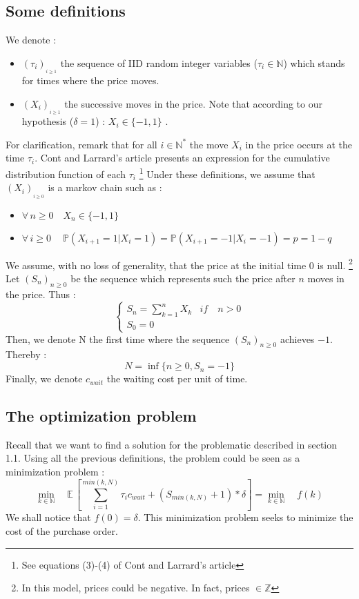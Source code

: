 \documentclass{article}
\begin{document}
\subsection{Some definitions}
We denote :
\begin{itemize}
\item $(\tau_i)_{_{i \geq 1}}$ the sequence of IID random integer variables  ($\tau_i \in \mathbb{N}$) which stands for times where the price moves.
\item $(X_i)_{_{i \geq 1}}$ the successive moves in the price. Note that according to our hypothesis ($\delta = 1$) : $X_i \in \{-1,1\}$ .
\end{itemize}
For clarification, remark that for all $ i \in \mathbb{N^{*}} $ the move $X_i$ in the price occurs at the time $\tau_i$.\newline
Cont and Larrard's article presents an expression for the cumulative distribution function of each $\tau_i$ \footnote{See equations (3)-(4) of Cont and Larrard's article}
\newline
Under these definitions, we assume that $(X_i)_{_{i \geq 0}}$ is a markov chain such as :
\begin{itemize}
\item $\forall \, n\geq0 \quad X_{n} \in \{-1,1\} $ 
\item $\forall \, i\geq0 \quad\ \mathbb{P}( X_{i+1}=1 | X_i=1 ) = \mathbb{P}( X_{i+1}=-1 | X_i=-1 ) = p = 1-q$
\end{itemize}
We assume, with no loss of generality, that the price at the initial time 0 is null. \footnote{In this model, prices could be negative. In fact, prices $\in \mathbb{Z}$}
Let $(S_{n})_{n\geq0}$ be the sequence which represents such the price after $n$ moves in the price. Thus :
\begin{equation*}
     \begin{cases}
        S_{n} = \sum_{k=1}^{n}X_k & if \quad n > 0 \\
        S_0 = 0
     \end{cases}
\end{equation*}
Then, we denote N the first time where the sequence $(S_{n})_{n\geq0}$  achieves $-1$. Thereby :
$$ N= \inf \{ n\geq0 , S_{n}=-1   \} $$
Finally, we denote $c_{wait}$ the waiting cost per unit of time.


\subsection{The optimization problem}
Recall that we want to find a solution for the problematic described in section 1.1.
Using all the previous definitions, the problem could be seen as a minimization problem  :
\begin{equation}
\min\limits_{k \in \mathbb{N}} \quad \mathbb{E}\,\left[ \sum_{i=1}^{min(k,N)}\tau_i c_{wait} + (S_{min(k,N)}+1)*\delta\right] = \min\limits_{k \in \mathbb{N}} \quad f(k)
\end{equation}
We shall notice that $f(0) = \delta$. This minimization problem seeks to minimize the cost of the purchase order. 
\end{document}
